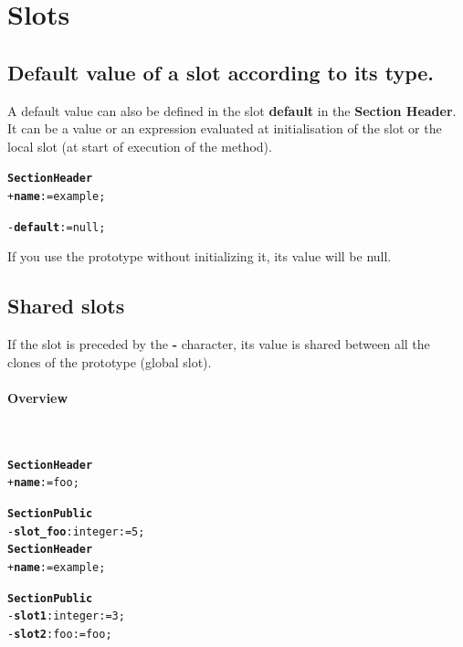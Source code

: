 \documentclass[11pt]{mybook}
\begin{document}
\section{Slots}
\label{language_reference:slots}

\subsection{Default value of a slot according to its type.}
\label{language_reference:type_names:default}
%
A default value can also be defined in the slot {\bf{}default} in the {\bf{}Section Header}.
It can be a value or an expression evaluated at initialisation of the slot or the local slot (at start of execution of the method).

\begin{alltt} 
{\bf{}Section Header}
  + {\bf{}name} := {\sc{}example};

  - {\bf{}default}:= {\sc{}null};
\end{alltt}

If you use the prototype without initializing it, its value will be {\sc{}null}.

\subsection{Shared slots}
\label{language_reference:slots:shared_slots}
If the slot is preceded by the {\bf{}-} character, its value is shared between all the clones of the prototype (global slot).
\paragraph{Overview}
 ~\\
\begin{alltt}
{\bf{}Section Header}
  + {\bf{}name} := {\sc{}foo};

{\bf{}Section Public}
  - {\bf{}slot\_foo}:{\sc{}integer} := 5;\\

{\bf{}Section Header}
  + {\bf{}name} := {\sc{}example};

{\bf{}Section Public}
  - {\bf{}slot1}:{\sc{}integer} := 3;
  - {\bf{}slot2}:{\sc{}foo} := {\sc{}foo};
\end{alltt}
\end{document}
